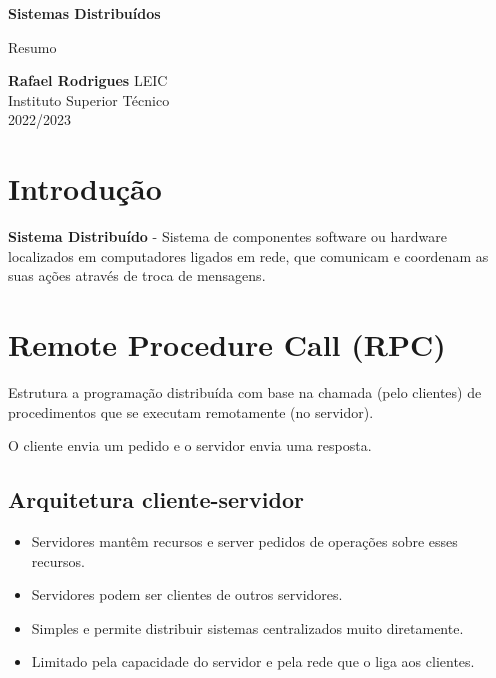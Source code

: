 \documentclass[12pt]{article}
\begin{document}
\begin{titlepage}
    \begin{center}
        \vspace*{1cm}

        \textbf{\LARGE Sistemas Distribuídos}
        \vspace{0.5cm}

        \Large Resumo
        \vspace{1.5cm}

        \textbf{Rafael Rodrigues}
        \vfill
        LEIC \\
        Instituto Superior Técnico \\
        2022/2023
    \end{center}
\end{titlepage}

\tableofcontents

\newpage

\section{Introdução}

\textbf{Sistema Distribuído} - Sistema de componentes software ou hardware localizados em computadores ligados em rede, que comunicam e coordenam as suas ações através de troca de mensagens.

\newpage

\section{Remote Procedure Call (RPC) }

Estrutura a programação distribuída com base na chamada (pelo clientes) de procedimentos que se executam remotamente (no servidor).

O cliente envia um pedido e o servidor envia uma resposta.

\subsection{Arquitetura cliente-servidor}

\begin{itemize}
    \item Servidores mantêm recursos e server pedidos de operações sobre esses recursos.
    \item Servidores podem ser clientes de outros servidores.
    \item Simples e permite distribuir sistemas centralizados muito diretamente.
    \item Limitado pela capacidade do servidor e pela rede que o liga aos clientes.
\end{itemize}
\end{document}
